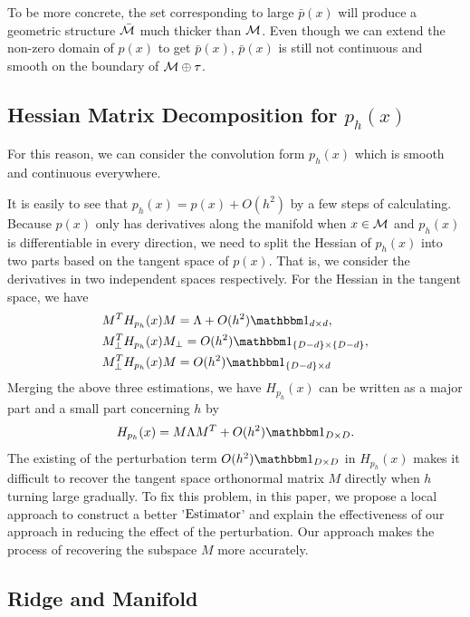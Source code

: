 \documentclass[aos,preprint]{imsart}
\theoremstyle{remark}
\begin{document}
To be more concrete, the set corresponding to large $\bar{p}(x)$ will produce a geometric structure $\bar{\cal M}$ much thicker than $\cal M$. Even though we can extend the non-zero domain of $p(x)$ to get $\bar{p}(x)$, $\bar{p}(x)$ is still not continuous and smooth on the boundary of $\cal M\oplus \tau$.

\subsection{Hessian Matrix Decomposition for $p_h(x)$}
For this reason, we can consider the convolution form $p_h(x)$ which is smooth and continuous everywhere.

It is easily to see that $p_h(x) = p(x)+O(h^2)$ by a few steps of calculating.
Because $p(x)$ only has derivatives along the manifold when $x\in \cal M$ and $p_h(x)$ is differentiable in every direction, we need to split the Hessian of $p_h(x)$ into two parts based on the tangent space of $p(x)$. That is, we consider the derivatives in two independent spaces respectively. For the Hessian in the tangent space, we have
\[
\begin{aligned}
 &M^T H_{p_h}(x) M =  \Lambda + O(h^2) \mathbbm 1_{d\times d},\\
 &M_\perp^T H_{p_h}(x) M_\perp  =  O(h^2) {\mathbbm 1}_{\{D-d\}\times \{D-d\}},\\
 &M_\perp^T H_{p_h}(x) M = O(h^2) {\mathbbm 1}_{\{D-d\}\times d}
\end{aligned}
\]
Merging the above three estimations, we have $H_{p_h}(x)$ can be written as a major part and a small part concerning $h$ by
\[
H_{p_h}(x) = M \Lambda M^T + O(h^2){\mathbbm 1}_{D\times D}.
\]
The existing of the perturbation term $O(h^2){\mathbbm 1}_{D\times D}$ in $H_{p_h}(x)$ makes it difficult to recover the tangent space orthonormal matrix $M$ directly when $h$ turning large gradually. To fix this problem, in this paper, we propose a local approach to construct a better '$\rm Estimator$' and explain the effectiveness of our approach in reducing the effect of the perturbation. Our approach makes the process of recovering the subspace $M$ more accurately. 

\subsection{Ridge and Manifold}
\end{document}
